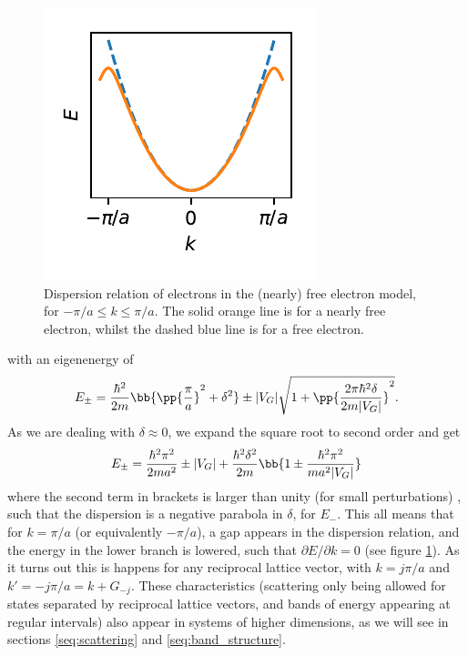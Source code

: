 \documentclass[main.tex]{subfiles}
\begin{document}
	\begin{figure}
		\begin{center}
			\includegraphics[width=\linewidth]{figures/nearly_free.pdf}
		\end{center}
		\caption{Dispersion relation of electrons in the (nearly) free electron model, for $ -\pi/a \leq k \leq \pi/a $. The solid orange line is for a nearly free electron, whilst the dashed blue line is for a free electron.}
		\label{fig:nearly_free}
	\end{figure}
	with an eigenenergy of
	\begin{equation}
		E_{\pm} = \frac{\hbar^2}{2m} \bb{\pp{\frac{\pi}{a}}^2 + \delta^2 } \pm |V_G| \sqrt{1+ \pp{\frac{2\pi\hbar^2 \delta}{2m |V_G|}}^2 }.
	\end{equation}
	As we are dealing with $ \delta \approx 0 $, we expand the square root to second order and get
	\begin{equation}
		E_{\pm} = \frac{\hbar^2 \pi^2}{2m a^2} \pm |V_G| + \frac{\hbar^2 \delta^2}{2m} \bb{1 \pm \frac{\hbar^2 \pi^2}{m a^2 |V_G|}}
	\end{equation}
	where the second term in brackets is larger than unity (for small perturbations) \cite{simon}, such that the dispersion is a negative parabola in $ \delta $, for $ E_- $. This all means that for $ k =\pi/a$ (or equivalently $ -\pi/a $), a gap appears in the dispersion relation, and the energy in the lower branch is lowered, such that $ \partial E/ \partial k =0$ (see figure \ref{fig:nearly_free}). As it turns out this is happens for any reciprocal lattice vector, with $ k = j \pi/a $ and $ k'=-j \pi /a = k+G_{-j}$. These characteristics (scattering only being allowed for states separated by reciprocal lattice vectors, and bands of energy appearing at regular intervals) also appear in systems of higher dimensions, as we will see in sections \ref{seq:scattering} and \ref{seq:band_structure}.
	
\end{document}
